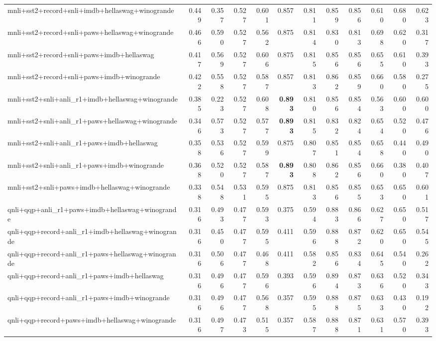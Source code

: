\begin{table}[t]
\begin{tabular}{lrrrrrrrrrrr}
    mnli+sst2+record+snli+imdb+hellaswag+winogrande & 0.449 & 0.357 & 0.527 & 0.601 & 0.857 & 0.811 & 0.859 & 0.856 & 0.610 & 0.680 & 0.623 \\
    mnli+sst2+record+snli+paws+hellaswag+winogrande & 0.466 & 0.590 & 0.527 & 0.562 & 0.875 & 0.814 & 0.830 & 0.813 & 0.698 & 0.620 & 0.317 \\
    mnli+sst2+record+snli+paws+imdb+hellaswag & 0.417 & 0.569 & 0.527 & 0.606 & 0.875 & 0.815 & 0.856 & 0.856 & 0.655 & 0.610 & 0.393 \\
    mnli+sst2+record+snli+paws+imdb+winogrande & 0.422 & 0.558 & 0.527 & 0.587 & 0.857 & 0.813 & 0.862 & 0.859 & 0.660 & 0.580 & 0.275 \\
    mnli+sst2+snli+anli\_r1+imdb+hellaswag+winogrande & 0.385 & 0.223 & 0.527 & 0.608 & \textbf{0.893} & 0.810 & 0.856 & 0.854 & 0.563 & 0.600 & 0.600 \\
    mnli+sst2+snli+anli\_r1+paws+hellaswag+winogrande & 0.346 & 0.573 & 0.527 & 0.577 & \textbf{0.893} & 0.815 & 0.832 & 0.824 & 0.654 & 0.520 & 0.476 \\
    mnli+sst2+snli+anli\_r1+paws+imdb+hellaswag & 0.358 & 0.536 & 0.527 & 0.599 & 0.875 & 0.807 & 0.851 & 0.854 & 0.658 & 0.440 & 0.490 \\
    mnli+sst2+snli+anli\_r1+paws+imdb+winogrande & 0.368 & 0.520 & 0.527 & 0.587 & \textbf{0.893} & 0.808 & 0.862 & 0.856 & 0.660 & 0.380 & 0.407 \\
    mnli+sst2+snli+paws+imdb+hellaswag+winogrande & 0.338 & 0.548 & 0.531 & 0.595 & 0.875 & 0.813 & 0.856 & 0.855 & 0.653 & 0.650 & 0.601 \\
    qnli+qqp+anli\_r1+paws+imdb+hellaswag+winogrande & 0.316 & 0.493 & 0.477 & 0.593 & 0.375 & 0.594 & 0.883 & 0.866 & 0.627 & 0.650 & 0.517 \\
    qnli+qqp+record+anli\_r1+imdb+hellaswag+winogrande & 0.316 & 0.450 & 0.477 & 0.595 & 0.411 & 0.596 & 0.888 & 0.872 & 0.620 & 0.650 & 0.545 \\
    qnli+qqp+record+anli\_r1+paws+hellaswag+winogrande & 0.316 & 0.506 & 0.477 & 0.468 & 0.411 & 0.582 & 0.856 & 0.834 & 0.645 & 0.540 & 0.262 \\
    qnli+qqp+record+anli\_r1+paws+imdb+hellaswag & 0.316 & 0.496 & 0.477 & 0.596 & 0.393 & 0.596 & 0.894 & 0.873 & 0.636 & 0.520 & 0.343 \\
    qnli+qqp+record+anli\_r1+paws+imdb+winogrande & 0.316 & 0.496 & 0.477 & 0.568 & 0.357 & 0.595 & 0.888 & 0.875 & 0.633 & 0.430 & 0.192 \\
    qnli+qqp+record+paws+imdb+hellaswag+winogrande & 0.316 & 0.497 & 0.473 & 0.515 & 0.357 & 0.587 & 0.888 & 0.871 & 0.631 & 0.570 & 0.393 \\

\end{tabular}
\end{table}
